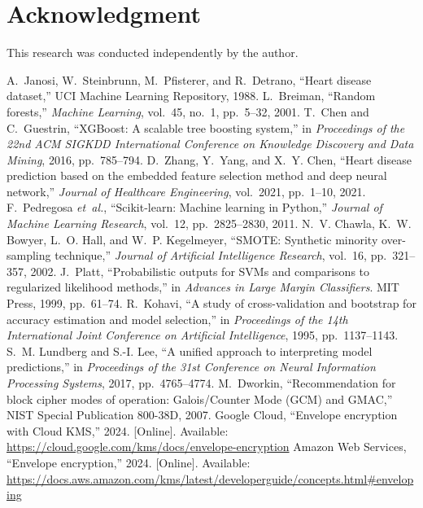 \documentclass[conference]{IEEEtran}
\begin{document}
  \section*{Acknowledgment}
  This research was conducted independently by the author.
\newpage
\newpage
\newpage
\newpage
\newpage
\newpage
\newpage
\newpage
\newpage
\begin{thebibliography}{00}
 A.~Janosi, W.~Steinbrunn, M.~Pfisterer, and R.~Detrano, ``Heart disease dataset,'' UCI Machine Learning Repository, 1988.
 L.~Breiman, ``Random forests,'' \emph{Machine Learning}, vol.~45, no.~1, pp.~5--32, 2001.
 T.~Chen and C.~Guestrin, ``XGBoost: A scalable tree boosting system,'' in \emph{Proceedings of the 22nd ACM SIGKDD International Conference on Knowledge Discovery and Data Mining}, 2016, pp.~785--794.
 D.~Zhang, Y.~Yang, and X.~Y. Chen, ``Heart disease prediction based on the embedded feature selection method and deep neural network,'' \emph{Journal of Healthcare Engineering}, vol.~2021, pp.~1--10, 2021.
 F.~Pedregosa \emph{et~al.}, ``Scikit-learn: Machine learning in Python,'' \emph{Journal of Machine Learning Research}, vol.~12, pp.~2825--2830, 2011.
 N.~V. Chawla, K.~W. Bowyer, L.~O. Hall, and W.~P. Kegelmeyer, ``SMOTE: Synthetic minority over-sampling technique,'' \emph{Journal of Artificial Intelligence Research}, vol.~16, pp.~321--357, 2002.
 J.~Platt, ``Probabilistic outputs for SVMs and comparisons to regularized likelihood methods,'' in \emph{Advances in Large Margin Classifiers}. MIT Press, 1999, pp.~61--74.
 R.~Kohavi, ``A study of cross-validation and bootstrap for accuracy estimation and model selection,'' in \emph{Proceedings of the 14th International Joint Conference on Artificial Intelligence}, 1995, pp.~1137--1143.
 S.~M. Lundberg and S.-I. Lee, ``A unified approach to interpreting model predictions,'' in \emph{Proceedings of the 31st Conference on Neural Information Processing Systems}, 2017, pp.~4765--4774.
 M.~Dworkin, ``Recommendation for block cipher modes of operation: Galois/Counter Mode (GCM) and GMAC,'' NIST Special Publication 800-38D, 2007.
 Google Cloud, ``Envelope encryption with Cloud KMS,'' 2024. [Online]. Available: \url{https://cloud.google.com/kms/docs/envelope-encryption}
 Amazon Web Services, ``Envelope encryption,'' 2024. [Online]. Available: \url{https://docs.aws.amazon.com/kms/latest/developerguide/concepts.html#enveloping}

\end{thebibliography}
\end{document}
